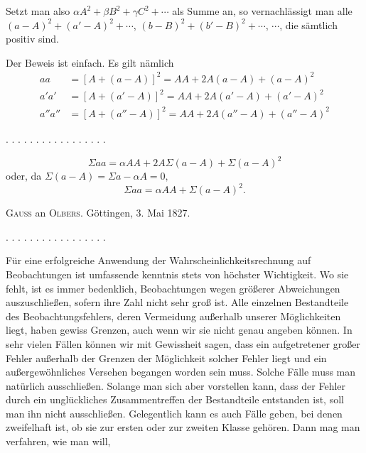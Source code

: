 Setzt man also $\alpha A^2+\beta B^2+\gamma C^2+\cdots$ als Summe an, so vernachlässigt man alle $(a-A)^2+(a'-A)^2+\cdots$, $(b-B)^2+(b'-B)^2+\cdots$, $\cdots$, die sämtlich positiv sind.

Der Beweis ist einfach. Es gilt nämlich
\[
\begin{aligned}
aa &= [A+(a-A)]^2 = AA+2A(a-A)+(a-A)^2\\
a'a' &= [A+(a'-A)]^2 = AA+2A(a'-A)+(a'-A)^2\\
a''a'' &= [A+(a''-A)]^2 = AA+2A(a''-A)+(a''-A)^2
\end{aligned}
\]
\begin{center}
. . . . . . . . . . . . . . . . .
\end{center}
\[
\Sigma aa = \alpha AA+2A\Sigma(a-A)+\Sigma(a-A)^2
\]
oder, da $\Sigma(a-A)=\Sigma a-\alpha A=0,$
\[
\Sigma aa = \alpha AA+\Sigma(a-A)^2.
\]
\begin{center}
\textsc{Gauss} an \textsc{Olbers}. Göttingen, 3. Mai 1827.
\end{center}

\begin{center}
. . . . . . . . . . . . . . . . .
\end{center}

Für eine erfolgreiche Anwendung der Wahrscheinlichkeitsrechnung auf Beobachtungen ist umfassende kenntnis stets von höchster Wichtigkeit. Wo sie fehlt, ist es immer bedenklich, Beobachtungen wegen größerer Abweichungen auszuschließen, sofern ihre Zahl nicht sehr groß ist. Alle einzelnen Bestandteile des Beobachtungsfehlers, deren Vermeidung außerhalb unserer Möglichkeiten liegt, haben gewiss Grenzen, auch wenn wir sie nicht genau angeben können. In sehr vielen Fällen können wir mit Gewissheit sagen, dass ein aufgetretener großer Fehler außerhalb der Grenzen der Möglichkeit solcher Fehler liegt und ein außergewöhnliches Versehen begangen worden sein muss. Solche Fälle muss man natürlich ausschließen. Solange man sich aber vorstellen kann, dass der Fehler durch ein unglückliches Zusammentreffen der Bestandteile entstanden ist, soll man ihn nicht ausschließen. Gelegentlich kann es auch Fälle geben, bei denen zweifelhaft ist, ob sie zur ersten oder zur zweiten Klasse gehören. Dann mag man verfahren, wie man will,
